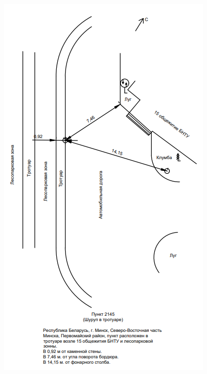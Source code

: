 \documentclass[a4paper]{article}
\begin{document}
\begin{newpage}
\begin{center}
            \includegraphics[scale=1.2]{abrisy/Абрис 2145.png}
    \end{center}

\end{newpage}
\end{document}
